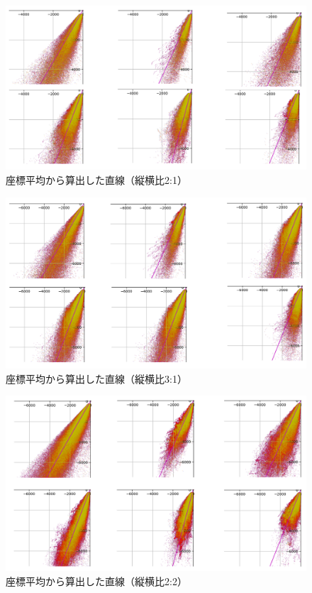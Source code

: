 \documentclass[12pt]{ltjsarticle}
\begin{document}
\begin{figure}[htbp]
    \centering
    \includegraphics*[keepaspectratio, scale=0.4]{2_1_analysis.PNG}
    \caption{座標平均から算出した直線（縦横比2:1）}
\end{figure}

\begin{figure}[htbp]
    \centering
    \includegraphics*[keepaspectratio, scale=0.4]{3_1_analysis.PNG}
    \caption{座標平均から算出した直線（縦横比3:1）}
\end{figure}

\begin{figure}[htbp]
    \centering
    \includegraphics*[keepaspectratio, scale=0.4]{2_2_analysis.PNG}
    \caption{座標平均から算出した直線（縦横比2:2）}
    \label{stress_plot_L}
\end{figure}
\end{document}
